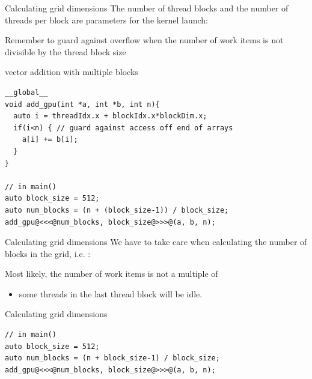 \documentclass[aspectratio=43]{beamer}
\begin{document}
\begin{frame}[fragile]{Calculating grid dimensions}
            The number of thread blocks and the number of threads per block are parameters for the kernel launch:
            \begin{center}
            \end{center}
            Remember to guard against overflow when the number of work items is not divisible by the thread block size

    \begin{code}{vector addition with multiple blocks}
        \begin{lstlisting}[style=boxcudatiny]
__global__
void add_gpu(int *a, int *b, int n){
  auto i = threadIdx.x + blockIdx.x*blockDim.x;
  if(i<n) { // guard against access off end of arrays
    a[i] += b[i];
  }
}

// in main()
auto block_size = 512;
auto num_blocks = (n + (block_size-1)) / block_size;
add_gpu@<<<@num_blocks, block_size@>>>@(a, b, n);
        \end{lstlisting}
    \end{code}
\end{frame}

\begin{frame}[fragile]{Calculating grid dimensions}
        We have to take care when calculating the number of blocks in the grid, i.e. :
        \begin{center}
        \end{center}
        Most likely, the number of work items  is not a multiple of 
        \begin{itemize}
            \item some threads in the last thread block will be idle.
        \end{itemize}

    \begin{code}{Calculating grid dimensions}
        \begin{lstlisting}[style=boxcudatiny]
// in main()
auto block_size = 512;
auto num_blocks = (n + block_size-1) / block_size;
add_gpu@<<<@num_blocks, block_size@>>>@(a, b, n);
        \end{lstlisting}
    \end{code}
\end{frame}
\end{document}
